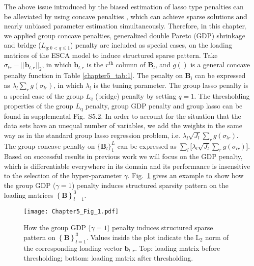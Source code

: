 The above issue introduced by the biased estimation of lasso type penalties can be alleviated by using concave penalties \cite{fu1998penalized,armagan2013generalized}, which can achieve sparse solutions and nearly unbiased parameter estimation simultaneously. Therefore, in this chapter, we applied group concave penalties, generalized double Pareto (GDP) shrinkage \cite{armagan2013generalized} and bridge ($L_{q: 0<q \leq 1}$) penalty \cite{fu1998penalized} are included as special cases, on the loading matrices of the ESCA model to induce structured sparse pattern. Take $\sigma_{lr} = ||\mathbf{b}_{l,r}||_2$, in which $\mathbf{b}_{l,r}$ is the $r^{\text{th}}$ column of $\mathbf{B}_l$, and $g()$ is a general concave penalty function in Table \ref{chapter5_tab:1}. The penalty on $\mathbf{B}_l$ can be expressed as $\lambda_l \sum_{r} g(\sigma_{lr})$, in which $\lambda_l$ is the tuning parameter. The group lasso penalty is a special case of the group $L_{q}$ (bridge) penalty by setting $q=1$. The thresholding properties of the group $L_{\text{q}}$ penalty, group GDP penalty and group lasso can be found in supplemental Fig.~S5.2. In order to account for the situation that the data sets have an unequal number of variables, we add the weights in the same way as in the standard group lasso regression problem, i.e. $\lambda_l \sqrt{J_l} \sum_{r} g(\sigma_{lr})$. The group concave penalty on $\{ \mathbf{B}_l \}_{1}^{L}$ can be expressed as $\sum_{l} \Big[\lambda_l \sqrt{J_l} \sum_{r} g(\sigma_{lr}) \Big]$. Based on successful results in previous work \cite{song2018generalized} we will focus on the GDP penalty, which is differentiable everywhere in its domain and its performance is insensitive to the selection of the hyper-parameter $\gamma$. Fig.~\ref{chapter5_fig:1} gives an example to show how the group GDP ($\gamma = 1$) penalty induces structured sparsity pattern on the loading matrices $\left\{\mathbf{B} \right\}_{l=1}^3$.
\begin{figure}[htbp]
    \centering
    \texttt{[image: Chapter5\_Fig\_1.pdf]}
    \caption{How the group GDP ($\gamma = 1$) penalty induces structured sparse pattern on $\left\{\mathbf{B} \right\}_{l=1}^3$. Values inside the plot indicate the $\text{L}_2$ norm of the corresponding loading vector $\mathbf{b}_{l,r}$. Top: loading matrix before thresholding; bottom: loading matrix after thresholding.}
	\label{chapter5_fig:1}
\end{figure}


